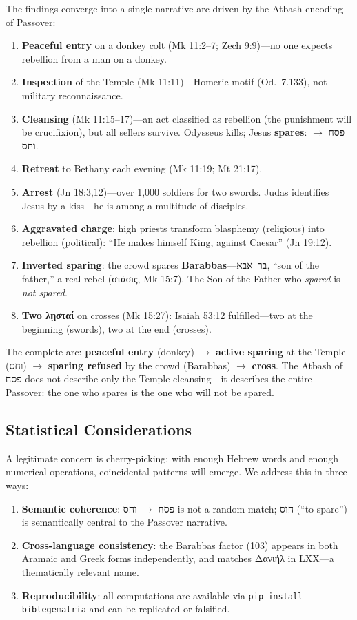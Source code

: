 \documentclass[12pt,a4paper]{article}
\begin{document}
The findings converge into a single narrative arc driven by the Atbash encoding of Passover:

\begin{enumerate}
    \item \textbf{Peaceful entry} on a donkey colt (Mk 11:2--7; Zech 9:9)---no one expects rebellion from a man on a donkey.
    \item \textbf{Inspection} of the Temple (Mk 11:11)---Homeric motif (Od.\ 7.133), not military reconnaissance.
    \item \textbf{Cleansing} (Mk 11:15--17)---an act classified as rebellion (the punishment will be crucifixion), but all sellers survive. Odysseus kills; Jesus \textbf{spares}: פסח $\to$ וחס.
    \item \textbf{Retreat} to Bethany each evening (Mk 11:19; Mt 21:17).
    \item \textbf{Arrest} (Jn 18:3,12)---over 1,000 soldiers for two swords. Judas identifies Jesus by a kiss---he is among a multitude of disciples.
    \item \textbf{Aggravated charge}: high priests transform blasphemy (religious) into rebellion (political): ``He makes himself King, against Caesar'' (Jn 19:12).
    \item \textbf{Inverted sparing}: the crowd spares \textbf{Barabbas}---בר~אבא, ``son of the father,'' a real rebel (στάσις, Mk 15:7). The Son of the Father who \textit{spared} is \textit{not spared}.
    \item \textbf{Two λῃσταί} on crosses (Mk 15:27): Isaiah 53:12 fulfilled---two at the beginning (swords), two at the end (crosses).
\end{enumerate}

The complete arc: \textbf{peaceful entry} (donkey) $\to$ \textbf{active sparing} at the Temple (וחס) $\to$ \textbf{sparing refused} by the crowd (Barabbas) $\to$ \textbf{cross}. The Atbash of פסח does not describe only the Temple cleansing---it describes the entire Passover: the one who spares is the one who will not be spared.

\subsection{Statistical Considerations}

A legitimate concern is cherry-picking: with enough Hebrew words and enough numerical operations, coincidental patterns will emerge. We address this in three ways:

\begin{enumerate}
    \item \textbf{Semantic coherence}: פסח $\to$ וחס is not a random match; חוס (``to spare'') is semantically central to the Passover narrative.
    \item \textbf{Cross-language consistency}: the Barabbas factor (103) appears in both Aramaic and Greek forms independently, and matches Δανιήλ in LXX---a thematically relevant name.
    \item \textbf{Reproducibility}: all computations are available via \texttt{pip install biblegematria} and can be replicated or falsified.
\end{enumerate}
\end{document}
